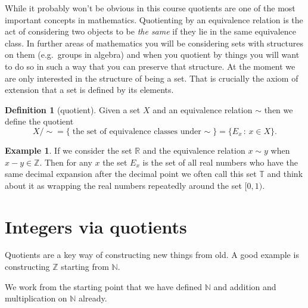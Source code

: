 \documentclass[
]{book}
\theoremstyle{definition}
\newtheorem{definition}{Definition}[chapter]
\theoremstyle{definition}
\newtheorem{example}{Example}[chapter]
\theoremstyle{definition}
\theoremstyle{definition}
\theoremstyle{remark}
\begin{document}
While it probably won't be obvious in this course quotients are one of the most important concepts in mathematics. Quotienting by an equivalence relation is the act of considering two objects to be \emph{the same} if they lie in the same equivalence class. In further areas of mathematics you will be considering sets with structures on them (e.g.~groups in algebra) and when you quotient by things you will want to do so in such a way that you can preserve that structure. At the moment we are only interested in the structure of being a set. That is crucially the axiom of extension that a set is defined by its elements.

\begin{definition}[quotient]
Given a set \(X\) and an equivalence relation \(\sim\) then we define the quotient
\[ X/\sim = \{\mbox{the set of equivalence classes under \(\sim\)}\}= \{ E_x \,:\, x \in X\}.\]
\end{definition}

\begin{example}
If we consider the set \(\mathbb{R}\) and the equivalence relation \(x \sim y\) when \(x-y \in \mathbb{Z}\). Then for any \(x\) the set \(E_x\) is the set of all real numbers who have the same decimal expansion after the decimal point we often call this set \(\mathbb{T}\) and think about it as wrapping the real numbers repeatedly around the set \([0,1)\).
\end{example}

\section{Integers via quotients}\label{integers-via-quotients}

Quotients are a key way of constructing new things from old. A good example is constructing \(\mathbb{Z}\) starting from \(\mathbb{N}\).

We work from the starting point that we have defined \(\mathbb{N}\) and addition and multiplication on \(\mathbb{N}\) already.
\end{document}
